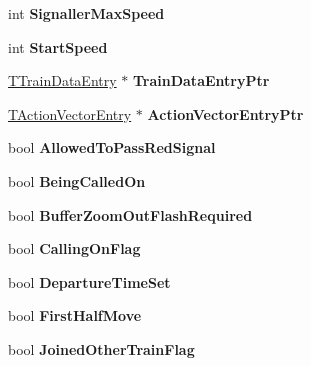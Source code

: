 \begin{DoxyCompactItemize}
\mbox{\label{class_t_train_ad11759e49fa6fcf8367090ef1db490b7}} 
int {\bfseries Signaller\+Max\+Speed}
\item 
\mbox{\label{class_t_train_adae3a1fd82da0457a983a3ac41cdda3d}} 
int {\bfseries Start\+Speed}
\item 
\mbox{\label{class_t_train_a28a2217abf201b23fd8b3b92c12038b7}} 
\mbox{\hyperlink{class_t_train_data_entry}{T\+Train\+Data\+Entry}} $\ast$ {\bfseries Train\+Data\+Entry\+Ptr}
\item 
\mbox{\label{class_t_train_a1caacc95f3c31b0d6f71704eeee44a00}} 
\mbox{\hyperlink{class_t_action_vector_entry}{T\+Action\+Vector\+Entry}} $\ast$ {\bfseries Action\+Vector\+Entry\+Ptr}
\item 
\mbox{\label{class_t_train_a8c94580b79a8ad1ad0fce51f0abba822}} 
bool {\bfseries Allowed\+To\+Pass\+Red\+Signal}
\item 
\mbox{\label{class_t_train_a33f0f08a95cc392557392d02e293c7c3}} 
bool {\bfseries Being\+Called\+On}
\item 
\mbox{\label{class_t_train_a60a3a9bebf64411f5d200682575a69ee}} 
bool {\bfseries Buffer\+Zoom\+Out\+Flash\+Required}
\item 
\mbox{\label{class_t_train_a5a658cdc377c3f4d65af6839614e7cb1}} 
bool {\bfseries Calling\+On\+Flag}
\item 
\mbox{\label{class_t_train_ab4f3876cb58a6160c2f1cd7a7eb3f234}} 
bool {\bfseries Departure\+Time\+Set}
\item 
\mbox{\label{class_t_train_a638de0cfb04b13fb28edd5e61d2d628f}} 
bool {\bfseries First\+Half\+Move}
\item 
\mbox{\label{class_t_train_a843a31af1c4faec4d71a61d32d6f4510}} 
bool {\bfseries Joined\+Other\+Train\+Flag}
\item 
\mbox{\label{class_t_train_a1b53d5506e8a5bdfd55286ae2dc2d3f2}} 

\end{DoxyCompactItemize}
